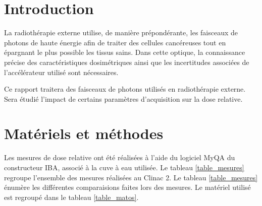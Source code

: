 \documentclass{article}
\begin{document}




\onehalfspacing

\pagestyle{fancy}
	\renewcommand\headrulewidth{0.5pt}
	\renewcommand\footrulewidth{0.5pt}
	\fancyfoot[R]{\thepage}

\tableofcontents
\clearpage
\section{Introduction}

La radiothérapie externe utilise, de manière prépondérante, les faisceaux de photons de haute énergie afin de traiter des cellules cancéreuses tout en épargnant le plus possible les tissus sains. Dans cette optique, la connaissance précise des caractéristiques dosimétriques ainsi que les incertitudes associées de l'accélérateur utilisé sont nécessaires. 

Ce rapport traitera des faisceaux de photons utilisés en radiothérapie externe. Sera étudié l'impact de certains paramètres d'acquisition sur la dose relative.

\section{Matériels et méthodes}

Les mesures de dose relative ont été réalisées à l'aide du logiciel MyQA du constructeur IBA, associé à la cuve à eau utilisée. Le tableau \ref*{table_mesures} regroupe l'ensemble des mesures réalisées au Clinac 2. Le tableau \ref*{table_mesures} énumère les différentes comparaisions faites lors des mesures. Le matériel utilisé est regroupé dans le tableau \ref*{table_matos}.
\end{document}
